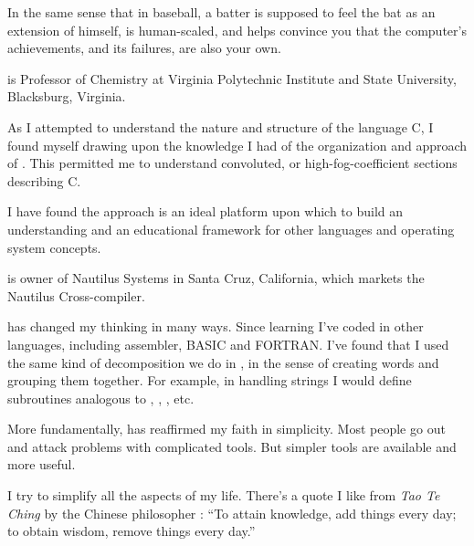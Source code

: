 \begin{interview}
\begin{tfquot}
In the same sense that in baseball, a batter is supposed to feel the bat as an 
extension of himself, \Forth{} is human-scaled, and helps convince you that
the computer's achievements, and its failures, are also your own.
\end{tfquot}
 is Professor of Chemistry at Virginia Polytechnic Institute
and State University, Blacksburg, Virginia.
\begin{tfquot}
As I attempted to understand the nature and structure of the language C, I 
found myself drawing upon the knowledge I had of the organization and
approach of \Forth{}.  This permitted me to understand convoluted, or
high-fog-coefficient sections describing C.

I have found the \Forth{} approach is an ideal platform upon which to build
an understanding and an educational framework for other languages and
operating system concepts.
\end{tfquot}
 is owner of Nautilus Systems in Santa Cruz, California, 
which markets the Nautilus Cross-compiler.
\begin{tfquot}
\Forth{} has changed my thinking in many ways.  Since learning \Forth{} 
I've coded in other languages, including assembler, BASIC and FORTRAN.
I've found that I used the same kind of decomposition we do in
\Forth{}, in the sense of creating words and grouping them together.  For
example, in handling strings I would define subroutines analogous to
, , , etc.

More fundamentally, \Forth{} has reaffirmed my faith in simplicity.  Most 
people go out and attack problems with complicated tools.  But simpler
tools are available and more useful.

I try to simplify all the aspects of my life.  There's a quote I like
from \emph{Tao Te Ching}
by the Chinese philosopher : ``To attain knowledge, add 
things every day; to obtain wisdom, remove things every day.''
\end{tfquot}
\end{interview}
